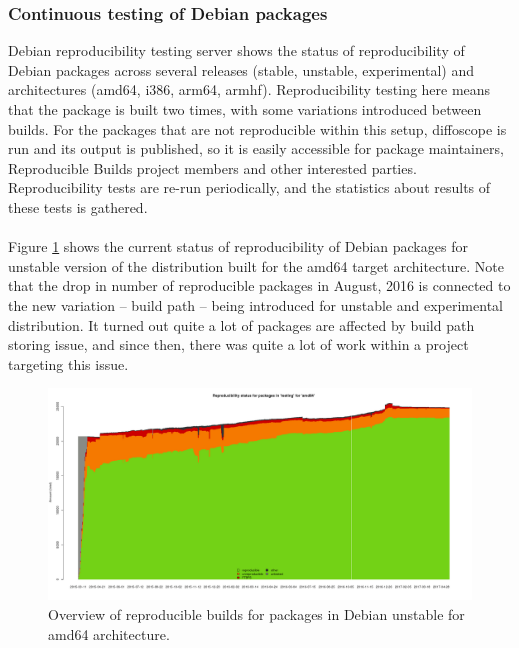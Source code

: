 {\subsubsection[Continuous testing of Debian packages]{Continuous testing of Debian packages} 
Debian reproducibility testing server \autocite{tests-rbo} shows the status of reproducibility of Debian packages across several releases (stable, unstable, experimental) and architectures (amd64, i386, arm64, armhf). Reproducibility testing here means that the package is built two times, with some variations introduced between builds. For the packages that are not reproducible within this setup, diffoscope is run and its output is published, so it is easily accessible for package maintainers, Reproducible Builds project members and other interested parties. Reproducibility tests are re-run periodically, and the statistics about results of these tests is gathered.\\\\
Figure \ref{fig:stats_sid} shows the current status of reproducibility of Debian packages for unstable version of the distribution built for the amd64 target architecture. Note that the drop in number of reproducible packages in August, 2016 is connected to the new variation -- build path -- being introduced for unstable and experimental distribution. It turned out quite a lot of packages are affected by build path storing issue, and since then, there was quite a lot of work within a project targeting this issue.
\FloatBarrier
\begin{figure}[h]
\centering
\includegraphics[width=1.05\textwidth]{fig/stats_pkg_state.png}
\caption{\label{fig:stats_sid}Overview of reproducible builds for packages in Debian unstable for amd64 architecture. \autocite{tests-rbo}}
\end{figure}
}
